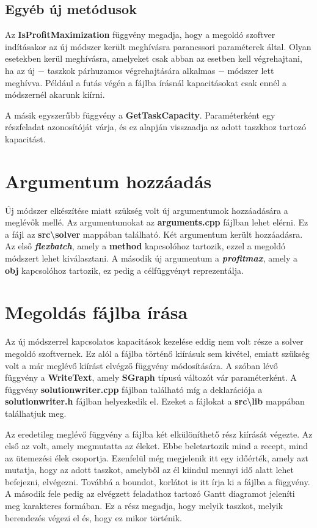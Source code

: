 \subsection{Egyéb új metódusok}
Az \textbf{IsProfitMaximization} függvény megadja, hogy a megoldó szoftver indításakor az új módszer került meghívásra parancssori paraméterek által. Olyan esetekben kerül meghívásra, amelyeket csak abban az esetben kell végrehajtani, ha az új $-$ taszkok párhuzamos végrehajtására alkalmas $-$ módszer lett meghívva. Például a futás végén a fájlba írásnál kapacitásokat csak ennél a módszernél akarunk kiírni.

A másik egyszerűbb függvény a \textbf{GetTaskCapacity}. Paraméterként egy részfeladat azonosítóját várja, és ez alapján visszaadja az adott taszkhoz tartozó kapacitást.

\section{Argumentum hozzáadás}
Új módszer elkészítése miatt szükség volt új argumentumok hozzáadására a meglévők mellé. Az argumentumokat az \textbf{arguments.cpp} fájlban lehet elérni. Ez a fájl az \textbf{src\textbackslash solver} mappában található. Két argumentum került hozzáadásra. Az első \textbf{\textit{flexbatch}}, amely a \textbf{method} kapcsolóhoz tartozik, ezzel a megoldó módszert lehet kiválasztani. A második új argumentum a \textbf{\textit{profit\textunderscore max}}, amely a \textbf{obj} kapcsolóhoz tartozik, ez pedig a célfüggvényt reprezentálja.

\section{Megoldás fájlba írása}
Az új módszerrel kapcsolatos kapacitások kezelése eddig nem volt része a solver megoldó szoftvernek. Ez alól a fájlba történő kiírásuk sem kivétel, emiatt szükség volt a már meglévő kiírást elvégző függvény módosítására. A szóban lévő függvény a \textbf{WriteText}, amely \textbf{SGraph} típusú változót vár paraméterként. A függvény \textbf{solutionwriter.cpp} fájlban található míg a deklarációja a \textbf{solutionwriter.h} fájlban helyezkedik el. Ezeket a fájlokat a \textbf{src\textbackslash lib} mappában találhatjuk meg. 

Az eredetileg meglévő függvény a fájlba két elkülöníthető rész kiírását végezte. Az első az volt, amely megmutatta az éleket. Ebbe beletartozik mind a recept, mind az ütemezési élek csoportja. Ezenfelül még megjelenik itt egy időérték, amely azt mutatja, hogy az adott taszkot, amelyből az él kiindul mennyi idő alatt lehet befejezni, elvégezni. Továbbá a boundot, korlátot is itt írja ki a fájlba a függvény. A második fele pedig az elvégzett feladathoz tartozó Gantt diagramot jeleníti meg karakteres formában. Ez a rész megadja, hogy melyik taszkot, melyik berendezés végezi el és, hogy ez mikor történik.

